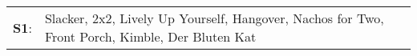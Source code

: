 \begin{supertabular}{p{0.03\textwidth}p{0.92\textwidth}}
 \textbf{S1}:  &  Slacker\textsuperscript{}, \enspace 2x2\textsuperscript{}, \enspace Lively Up Yourself\textsuperscript{}, \enspace Hangover\textsuperscript{}, \enspace Nachos for Two\textsuperscript{}, \enspace Front Porch\textsuperscript{}, \enspace Kimble\textsuperscript{}, \enspace Der Bluten Kat\textsuperscript{}  \enspace  \\
\end{supertabular}

